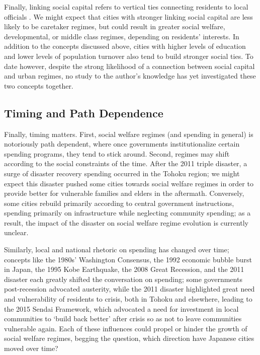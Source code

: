 \documentclass[preprint, 3p,
authoryear]{elsarticle} %
\begin{document}
Finally, linking social capital refers to vertical ties connecting
residents to local officials \citep{woolcock_2010, aldrich_2019}. We
might expect that cities with stronger linking social capital are less
likely to be caretaker regimes, but could result in greater social
welfare, developmental, or middle class regimes, depending on residents'
interests. In addition to the concepts discussed above, cities with
higher levels of education and lower levels of population turnover also
tend to build stronger social ties. To date however, despite the strong
likelihood of a connection between social capital and urban regimes, no
study to the author's knowledge has yet investigated these two concepts
together.

\hypertarget{timing-and-path-dependence}{%
\subsection{Timing and Path
Dependence}\label{timing-and-path-dependence}}

Finally, timing matters. First, social welfare regimes (and spending in
general) is notoriously path dependent, where once governments
institutionalize certain spending programs, they tend to stick around.
Second, regimes may shift according to the social constraints of the
time. After the 2011 triple disaster, a surge of disaster recovery
spending occurred in the Tohoku region; we might expect this disaster
pushed some cities towards social welfare regimes in order to provide
better for vulnerable families and elders in the aftermath. Conversely,
some cities rebuild primarily according to central government
instructions, spending primarily on infrastructure while neglecting
community spending; as a result, the impact of the disaster on social
welfare regime evolution is currently unclear.

Similarly, local and national rhetoric on spending has changed over
time; concepts like the 1980s' Washington Consensus, the 1992 economic
bubble burst in Japan, the 1995 Kobe Earthquake, the 2008 Great
Recession, and the 2011 disaster each greatly shifted the conversation
on spending; some governments post-recession advocated austerity, while
the 2011 disaster highlighted great need and vulnerability of residents
to crisis, both in Tohoku and elsewhere, leading to the 2015 Sendai
Framework, which advocated a need for investment in local communities to
`build back better' after crisis so as not to leave communities
vulnerable again. Each of these influences could propel or hinder the
growth of social welfare regimes, begging the question, which direction
have Japanese cities moved over time?
\end{document}
